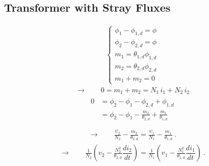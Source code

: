 \documentclass[letterpaper,10pt,english]{jupyterBook}
\begin{document}
\subsection{Transformer with Stray Fluxes}
\label{\detokenize{ch/circuits-electromagnetic-transformer:transformer-with-stray-fluxes}}\begin{equation*}
\begin{split}\begin{cases}
  \phi_1 - \phi_{1,d} = \phi \\
  \phi_2 - \phi_{2,d} = \phi \\
  m_1 = \theta_{1,d} \phi_{1,d} \\
  m_2 = \theta_{2,d} \phi_{2,d} \\
  m_1 + m_2 = 0
\end{cases}\end{split}
\end{equation*}\begin{equation*}
\begin{split}\rightarrow \qquad 0 = m_1 + m_2 = N_1 \, i_1 + N_2 \, i_2\end{split}
\end{equation*}\begin{equation*}
\begin{split}\begin{aligned}
  0 & = \phi_2 - \phi_1 - \phi_{2,d} + \phi_{1,d} \\
    & = \phi_2 - \phi_1 - \frac{m_2}{\theta_{2,d}} + \frac{m_1}{\theta_{1,d}} \\
\end{aligned}\end{split}
\end{equation*}\begin{equation*}
\begin{split}\rightarrow \qquad \frac{\psi_2}{N_2} - \frac{m_2}{\theta_{2,d}} = \frac{\psi_1}{N_1} - \frac{m_1}{\theta_{1,d}} \ .\end{split}
\end{equation*}\begin{equation*}
\begin{split}\rightarrow \qquad \frac{1}{N_2} \left( v_2 - \frac{N_2^2}{\theta_{2,d}} \dfrac{d i_2}{d t} \right) =
                     \frac{1}{N_1} \left( v_1 - \frac{N_1^2}{\theta_{1,d}} \dfrac{d i_1}{d t} \right)  \ .\end{split}
\end{equation*}
\end{document}
